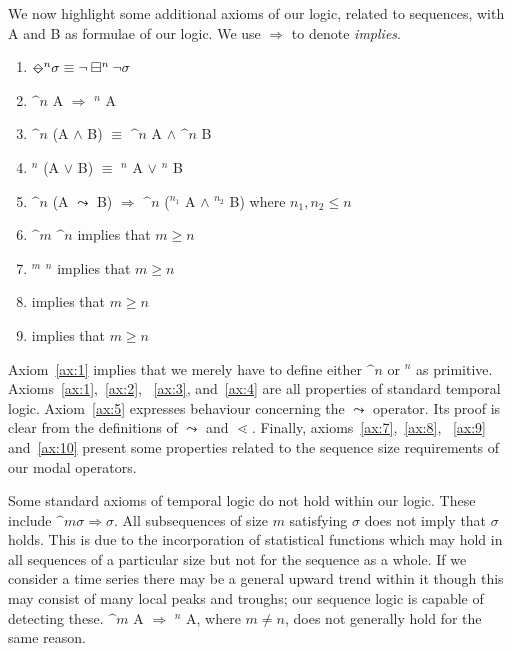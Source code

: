 We now highlight some additional axioms of our logic, related to
sequences, with A and B as formulae of our logic. We use $\Rightarrow$
to denote {\em implies}.

\begin{enumerate}
\item\label{ax:1} $\mbox{\diam}^n \sigma \equiv \neg \bm^n \neg \sigma$
\item\label{ax:2} $\bm^n$ A $\Rightarrow$ \diam$^n$ A
\item\label{ax:3} $\bm^n$ (A $\wedge$ B) $\equiv$ $\bm^n$ A $\wedge$ $\bm^n$ B
\item\label{ax:4} \diam$^n$ (A $\vee$ B) $\equiv$ \diam$^n$ A $\vee$ \diam$^n$ B
\item\label{ax:5} $\bm^n$ (A $\leadsto$ B) $\Rightarrow$ $\bm^n$
(\diam$^{n_1}$ A $\wedge$ \diam$^{n_2}$ B) where $n_1, n_2 \le n$
\item\label{ax:7} $\bm^m$ $\bm^n$ implies that $m \ge n$
\item\label{ax:8} \diam$^m$ \diam$^n$ implies that $m \ge n$
\item\label{ax:9}  implies that $m \ge n$
\item\label{ax:10}  implies that $m \ge n$
\end{enumerate}

Axiom~\ref{ax:1} implies that we merely have to define either $\bm^n$
or \diam$^n$ as primitive. Axioms~\ref{ax:1},~\ref{ax:2}, ~\ref{ax:3},
and~\ref{ax:4} are all properties of standard temporal
logic. Axiom~\ref{ax:5} expresses behaviour concerning
the $\leadsto$ operator. Its proof is clear from the definitions of
$\leadsto$ and $\lessdot$. Finally, axioms~\ref{ax:7},~\ref{ax:8}, ~\ref{ax:9} and~\ref{ax:10}
present some properties related to the sequence size requirements of our modal
operators.  

\medskip

Some standard axioms of temporal logic do not hold within our
logic. These include \linebreak $\bm^{m} \sigma \Rightarrow \sigma$. All
subsequences of size $m$ satisfying $\sigma$ does not imply that
$\sigma$ holds. This is due to the incorporation of statistical
functions which may hold in all sequences of a particular size but not
for the sequence as a whole. If we consider a time series there may be
a general upward trend within it though this may consist of many
local peaks and troughs; our sequence logic is capable of detecting
these. $\bm^m$ A $\Rightarrow$ \diam$^n$ A, where $m \not= n$, does
not generally hold for the same reason.

